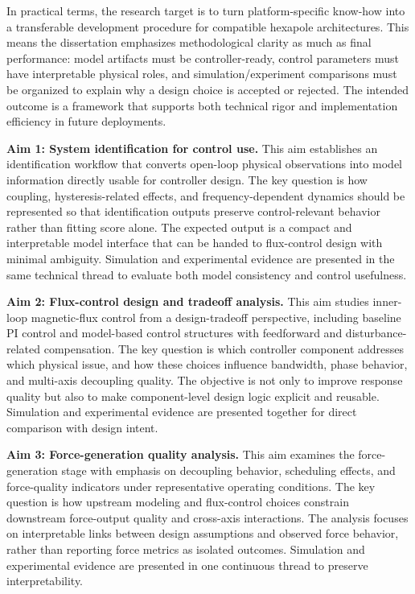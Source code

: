 In practical terms, the research target is to turn platform-specific know-how into a transferable development procedure for compatible hexapole architectures. This means the dissertation emphasizes methodological clarity as much as final performance: model artifacts must be controller-ready, control parameters must have interpretable physical roles, and simulation/experiment comparisons must be organized to explain why a design choice is accepted or rejected. The intended outcome is a framework that supports both technical rigor and implementation efficiency in future deployments.

\textbf{Aim 1: System identification for control use.}
This aim establishes an identification workflow that converts open-loop physical observations into model information directly usable for controller design. The key question is how coupling, hysteresis-related effects, and frequency-dependent dynamics should be represented so that identification outputs preserve control-relevant behavior rather than fitting score alone. The expected output is a compact and interpretable model interface that can be handed to flux-control design with minimal ambiguity. Simulation and experimental evidence are presented in the same technical thread to evaluate both model consistency and control usefulness.

\textbf{Aim 2: Flux-control design and tradeoff analysis.}
This aim studies inner-loop magnetic-flux control from a design-tradeoff perspective, including baseline PI control and model-based control structures with feedforward and disturbance-related compensation. The key question is which controller component addresses which physical issue, and how these choices influence bandwidth, phase behavior, and multi-axis decoupling quality. The objective is not only to improve response quality but also to make component-level design logic explicit and reusable. Simulation and experimental evidence are presented together for direct comparison with design intent.

\textbf{Aim 3: Force-generation quality analysis.}
This aim examines the force-generation stage with emphasis on decoupling behavior, scheduling effects, and force-quality indicators under representative operating conditions. The key question is how upstream modeling and flux-control choices constrain downstream force-output quality and cross-axis interactions. The analysis focuses on interpretable links between design assumptions and observed force behavior, rather than reporting force metrics as isolated outcomes. Simulation and experimental evidence are presented in one continuous thread to preserve interpretability.

